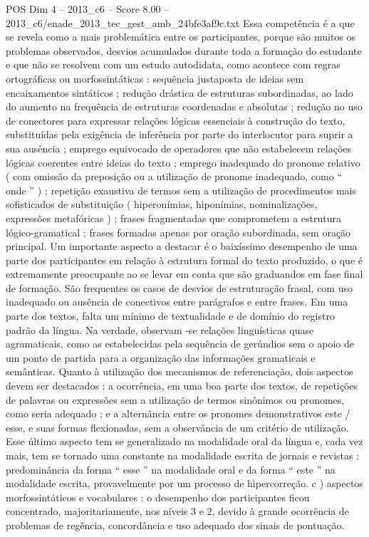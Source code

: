 \begin{textsample}{POS Dim 4 – 2013\_c6 – Score 8.00 – 2013\_c6/enade\_2013\_tec\_gest\_amb\_24bfe3af9c.txt}
Essa competência é a que se revela como a mais problemática entre os participantes, porque são muitos os problemas observados, desvios acumulados durante toda a formação do estudante e que não se resolvem com um estudo autodidata, como acontece com regras ortográficas ou morfossintáticas : sequência justaposta de ideias sem encaixamentos sintáticos ; redução drástica de estruturas subordinadas, ao lado do aumento na frequência de estruturas coordenadas e absolutas ; redução no uso de conectores para expressar relações lógicas essenciais à construção do texto, substituídas pela exigência de inferência por parte do interlocutor para suprir a sua ausência ; emprego equivocado de operadores que não estabelecem relações lógicas coerentes entre ideias do texto ; emprego inadequado do pronome relativo ( com omissão da preposição ou a utilização de pronome inadequado, como “ onde ” ) ; repetição exaustiva de termos sem a utilização de procedimentos mais sofisticados de substituição ( hiperonímias, hiponímias, nominalizações, expressões metafóricas ) ; frases fragmentadas que comprometem a estrutura lógico-gramatical ; frases formadas apenas por oração subordinada, sem oração principal.
Um importante aspecto a destacar é o baixíssimo desempenho de uma parte dos participantes em relação à estrutura formal do texto produzido, o que é extremamente preocupante ao se levar em conta que são graduandos em fase final de formação.
São frequentes os casos de desvios de estruturação frasal, com uso inadequado ou ausência de conectivos entre parágrafos e entre frases.
Em uma parte dos textos, falta um mínimo de textualidade e de domínio do registro padrão da língua.
Na verdade, observam -se relações linguísticas quase agramaticais, como as estabelecidas pela sequência de gerúndios sem o apoio de um ponto de partida para a organização das informações gramaticais e semânticas.
Quanto à utilização dos mecanismos de referenciação, dois aspectos devem ser destacados : a ocorrência, em uma boa parte dos textos, de repetições de palavras ou expressões sem a utilização de termos sinônimos ou pronomes, como seria adequado ; e a alternância entre os pronomes demonstrativos este / esse, e suas formas flexionadas, sem a observância de um critério de utilização.
Esse último aspecto tem se generalizado na modalidade oral da língua e, cada vez mais, tem se tornado uma constante na modalidade escrita de jornais e revistas : predominância da forma “ esse ” na modalidade oral e da forma “ este ” na modalidade escrita, provavelmente por um processo de hipercorreção. c ) aspectos morfossintáticos e vocabulares : o desempenho dos participantes ficou concentrado, majoritariamente, nos níveis 3 e 2, devido à grande ocorrência de problemas de regência, concordância e uso adequado dos sinais de pontuação.

\end{textsample}
